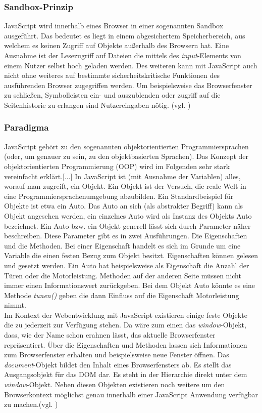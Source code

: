 \subsubsection{Sandbox-Prinzip} JavaScript wird innerhalb eines Browser in einer sogenannten Sandbox ausgeführt. Das bedeutet es liegt in einem abgesichertem Speicherbereich, aus welchem es keinen Zugriff auf Objekte außerhalb des Browsern hat. Eine Ausnahme ist der Lesezugriff auf Dateien die mittels des \textit{input}-Elements von einem Nutzer selbst hoch geladen werden. Des weiteren kann mit JavaScript auch nicht ohne weiteres auf bestimmte sicherheitskritische Funktionen des ausführenden Browser zugegriffen werden. Um beispielsweise das Browserfenster zu schließen, Symbolleisten ein- und auszublenden oder zugriff auf die Seitenhistorie zu erlangen sind Nutzereingaben nötig. (vgl. \cite{WikiJS2014})

\subsubsection{Paradigma} \glqq JavaScript gehört zu den sogenannten objektorientierten Programmiersprachen (oder, um genauer zu sein, zu den objektbasierten Sprachen). Das Konzept der objektorientierten Programmierung (OOP) wird im Folgenden sehr stark vereinfacht erklärt.[...] In JavaScript ist (mit Ausnahme der Variablen) alles, worauf man zugreift, ein Objekt. Ein Objekt ist der Versuch, die reale Welt in eine Programmiersprachenumgebung abzubilden. Ein Standardbeispiel für Objekte ist etwa ein Auto. Das Auto an sich (als abstrakter Begriff) kann als Objekt angesehen werden, ein einzelnes Auto wird als Instanz des Objekts Auto bezeichnet.\grqq{}\cite[S.93]{WenzJava2008} Ein Auto bzw. ein Objekt generell lässt sich durch Parameter näher beschreiben. Diese Parameter gibt es in zwei Ausführungen. Die Eigenschaften und die Methoden. Bei einer Eigenschaft handelt es sich im Grunde um eine Variable die einen festen Bezug zum Objekt besitzt. Eigenschaften können gelesen und gesetzt werden. Ein Auto hat beispielsweise als Eigenschaft die Anzahl der Türen oder die Motorleistung. Methoden auf der anderen Seite müssen nicht immer einen Informationswert zurückgeben. Bei dem Objekt Auto könnte es eine Methode \textit{tunen()} geben die dann Einfluss auf die Eigenschaft Motorleistung nimmt.\\Im Kontext der Webentwicklung mit JavaScript existieren einige feste Objekte die zu jederzeit zur Verfügung stehen. Da wäre zum einen das \textit{window}-Objekt, dass, wie der Name schon erahnen lässt, das aktuelle Browserfenster repräsentiert. Über die Eigenschaften und Methoden lassen sich Informationen zum Browserfenster erhalten und beispielsweise neue Fenster öffnen. Das \textit{document}-Objekt bildet den Inhalt eines Browserfensters ab. Es stellt das Ausgangsobjekt für das DOM dar. Es steht in der Hierarchie direkt unter dem \textit{window}-Objekt. Neben diesen Objekten existieren noch weitere um den Browserkontext möglichst genau innerhalb einer JavaScript Anwendung verfügbar zu machen.(vgl. \cite{SelfHtml20147})

